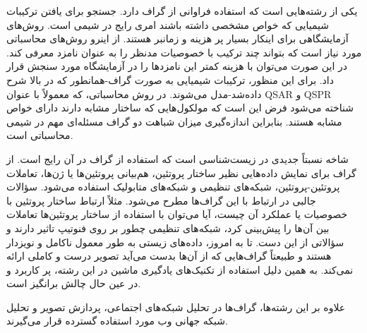  یکی از رشته‌هایی است که استفاده فراوانی از گراف دارد. جستجو برای یافتن ترکیبات شیمیایی که خواص مشخصی داشته باشند امری رایج در شیمی است. روش‌های آزمایشگاهی برای اینکار بسیار پر هزینه و زمانبر هستند. از اینرو روش‌های محاسباتی مورد نیاز است که بتواند چند ترکیب با خصوصیات مدنظر را به عنوان نامزد معرفی کند. در این صورت می‌توان با هزینه کمتر این نامزدها را در آزمایشگاه مورد سنجش قرار داد. برای این منظور، ترکیبات شیمیایی به صورت گراف-همانطور که در بالا شرح داده‌شد-مدل می‌شوند. در روش محاسباتی، که معمولاً با عنوان QSAR و QSPR شناخته می‌شود فرض این است که مولکول‌هایی که ساختار مشابه دارند دارای خواص مشابه هستند. بنابراین اندازه‌گیری میزان شباهت دو گراف مسئله‌ای مهم در شیمی محاسباتی است.

 شاخه نسبتاً جدیدی در زیست‌شناسی است که استفاده از گراف در آن رایج است. از گراف‌ برای نمایش داده‌هایی نظیر ساختار پروتئین‌، هم‌بیانی پروتئین‌ها یا ژن‌ها، تعاملات پروتئین-پروتئین، شبکه‌های تنظیمی و شبکه‌های متابولیک استفاده می‌شود. سؤالات جالبی در ارتباط با این گراف‌ها مطرح می‌شود. مثلاً ارتباط ساختار پروتئین با خصوصیات یا عملکرد آن چیست، آیا می‌توان با استفاده از ساختار پروتئین‌ها تعاملات بین آن‌ها را پیش‌بینی کرد، شبکه‌های تنظیمی چطور بر روی فنوتیپ تاثیر دارند و سؤالاتی از این دست. تا به امروز، داده‌های زیستی به طور معمول ناکامل و نویزدار هستند و طبیعتاً گراف‌هایی که از آن‌ها بدست می‌آید تصویر درست و کاملی ارائه نمی‌کند. به همین دلیل استفاده از تکنیک‌های یادگیری ماشین در این رشته، پر کاربرد و در عین حال چالش برانگیز است.


علاوه بر این رشته‌ها، گراف‌ها در تحلیل شبکه‌های اجتماعی، پردازش تصویر و تحلیل شبکه‌ جهانی وب مورد استفاده گسترده قرار می‌گیرند.

